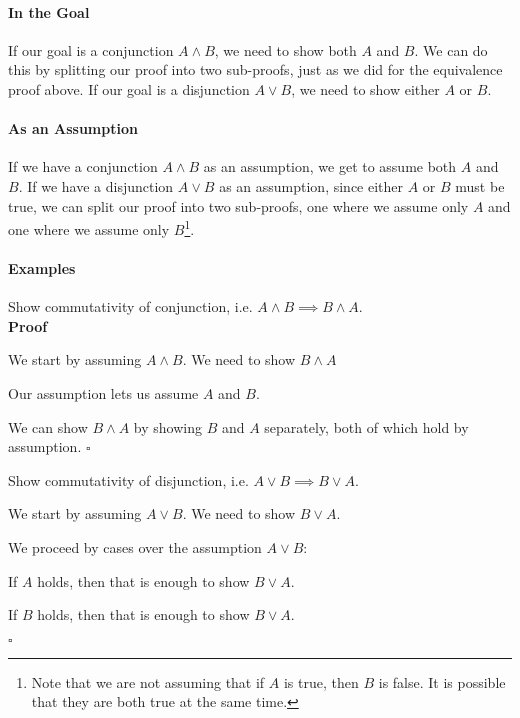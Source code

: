 \documentclass{tufte-handout}
\begin{document}
\paragraph{In the Goal}
If our goal is a conjunction $A \land B$, we need to show both $A$
and $B$. We can do this by splitting our proof into two
sub-proofs, just as we did for the equivalence proof above.
%
If our goal is a disjunction $A \lor B$, we need to show either
$A$ or $B$.

\paragraph{As an Assumption}
If we have a conjunction $A \land B$ as an assumption, we get to
assume both $A$ and $B$. If we have a disjunction $A \lor B$ as an
assumption, since either $A$ or $B$ must be true, we can split our
proof into two sub-proofs, one where we assume only $A$ and one
where we assume only $B$\footnote{Note that we are not assuming
  that if $A$ is true, then $B$ is false. It is possible that they
  are both true at the same time. }.


\paragraph{Examples}

\begin{itemize}
\item Show commutativity of conjunction, i.e. $A \land B \implies B \land A$.\\
  \textbf{Proof}
  \begin{compactenum}
  \item We start by assuming $A \land B$. We need to show $B \land A$
  \item Our assumption lets us assume $A$ and $B$.
  \item We can show $B \land A$ by showing $B$ and $A$ separately,
    both of which hold by assumption. $\square$
  \end{compactenum}
\item Show commutativity of disjunction, i.e. $A \lor B \implies B \lor A$.\\
  \begin{compactenum}
  \item We start by assuming $A \lor B$. We need to show $B \lor A$.
  \item We proceed by cases over the assumption $A \lor B$:
    \begin{compactenum}
    \item If $A$ holds, then that is enough to show $B \lor A$.
    \item If $B$ holds, then that is enough to show $B \lor A$.
    \end{compactenum}
  \end{compactenum}
  $\square$
\end{itemize}
\end{document}
